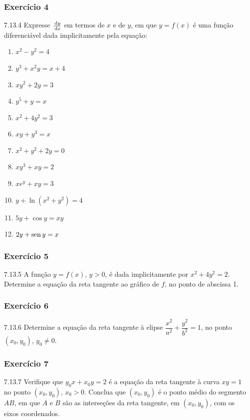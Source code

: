 \subsubsection*{Exercício 4}
\begin{exercicio}[4]{7.13.4}
Expresse $\frac{\,\mathrm{d} y}{\,\mathrm{d} x}$ em termos de $x$ e de $y$, em que $y = f(x)$ é uma função diferenciável dada implicitamente pela equação:
\begin{enumerate}[label=\alph*)]
    \item $x^2 - y^2 = 4$
    \item $y^3 + x^2 y = x + 4$
    \item $xy^2 + 2y = 3$
    \item $y^5 + y = x$
    \item $x^2 + 4y^2 = 3$
    \item $xy + y^3 = x$
    \item $x^2 + y^2 + 2y = 0$
    \item $xy^3 + xy = 2$
    \item $xe^y + xy = 3$
    \item $y + \ln(x^2 + y^2) = 4$
    \item $5y + \cos y = xy$
    \item $2y + \operatorname{sen} y = x$
\end{enumerate}
\end{exercicio}

\subsubsection*{Exercício 5}
\begin{exercicio}[5]{7.13.5}
A função $y = f(x)$, $y > 0$, é dada implicitamente por $x^2 + 4y^2 = 2$. Determine a equação da reta tangente ao gráfico de $f$, no ponto de abscissa 1.
\end{exercicio}

\subsubsection*{Exercício 6}
\begin{exercicio}[6]{7.13.6}
Determine a equação da reta tangente à elipse $\dfrac{x^2}{a^2} + \dfrac{y^2}{b^2} = 1$, no ponto $(x_0, y_0)$, $y_0 \neq 0$.
\end{exercicio}

\subsubsection*{Exercício 7}
\begin{exercicio}[7]{7.13.7}
Verifique que $y_0 x + x_0 y = 2$ é a equação da reta tangente à curva $xy = 1$ no ponto $(x_0, y_0)$, $x_0 > 0$. Conclua que $(x_0, y_0)$ é o ponto médio do segmento $AB$, em que $A$ e $B$ são as interseções da reta tangente, em $(x_0, y_0)$, com os eixos coordenados.
\end{exercicio}

